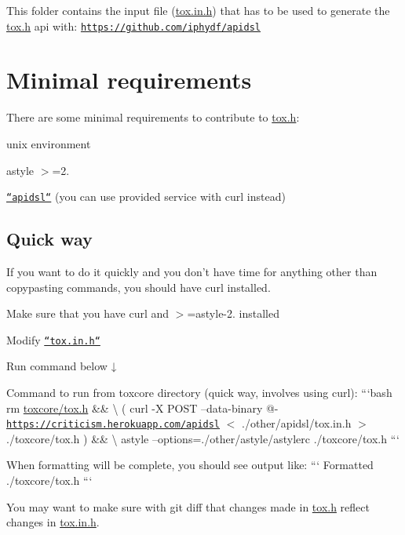 This folder contains the input file ({\ttfamily \hyperlink{tox_8in_8h}{tox.\+in.\+h}}) that has to be used to generate the {\ttfamily \hyperlink{tox_8h}{tox.\+h}} api with\+: \href{https://github.com/iphydf/apidsl}{\tt https\+://github.\+com/iphydf/apidsl}

\section*{Minimal requirements}

There are some minimal requirements to contribute to {\ttfamily \hyperlink{tox_8h}{tox.\+h}}\+:
\begin{DoxyItemize}
\item unix environment
\item {\ttfamily astyle} {\ttfamily $>$=2.}
\item \href{https://github.com/iphydf/apidsl}{\tt ``apidsl``} (you can use provided service with curl instead)
\end{DoxyItemize}

\subsection*{Quick way}

If you want to do it quickly and you don't have time for anything other than copypasting commands, you should have {\ttfamily curl} installed.


\begin{DoxyEnumerate}
\item Make sure that you have {\ttfamily curl} and {\ttfamily $>$=astyle-\/2.} installed
\item Modify \href{/other/apidsl/tox.in.h}{\tt ``tox.in.\+h``}
\item Run command below ↓
\end{DoxyEnumerate}

Command to run from {\ttfamily toxcore} directory (quick way, involves using curl)\+: ```bash rm \hyperlink{tox_8h}{toxcore/tox.\+h} \&\& \textbackslash{} ( curl -\/\+X P\+O\+S\+T --data-\/binary @-\/ \href{https://criticism.herokuapp.com/apidsl}{\tt https\+://criticism.\+herokuapp.\+com/apidsl} $<$ ./other/apidsl/tox.in.\+h $>$ ./toxcore/tox.h ) \&\& \textbackslash{} astyle --options=./other/astyle/astylerc ./toxcore/tox.h ```

When formatting will be complete, you should see output like\+: ``` Formatted ./toxcore/tox.h ```

You may want to make sure with {\ttfamily git diff} that changes made in {\ttfamily \hyperlink{tox_8h}{tox.\+h}} reflect changes in {\ttfamily \hyperlink{tox_8in_8h}{tox.\+in.\+h}}.

